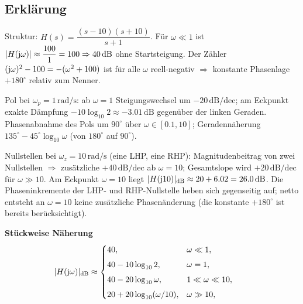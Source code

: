 \subsection{Erklärung}
\vspace{5mm}
\begin{description}[leftmargin=1.2em,labelsep=.6em,font=\bfseries]
\item[Schritt 1] Struktur: $H(s)=\dfrac{(s-10)(s+10)}{s+1}$. Für $\omega\ll1$ ist $|H(\operatorname{j}\!\omega)|\approx\dfrac{100}{1}=100\Rightarrow 40\,\mathrm{dB}$ ohne Startsteigung. Der Zähler $(\operatorname{j}\!\omega)^2-100=-(\omega^2+100)$ ist für alle $\omega$ reell-negativ $\Rightarrow$ konstante Phasenlage $+180^\circ$ relativ zum Nenner.
\item[Schritt 2] Pol bei $\omega_p=1\,\mathrm{rad/s}$: ab $\omega=1$ Steigungswechsel um $-20\,\mathrm{dB/dec}$; am Eckpunkt exakte Dämpfung $-10\log_{10}2\approx-3.01\,\mathrm{dB}$ gegenüber der linken Geraden. Phasenabnahme des Pols um $90^\circ$ über $\omega\in[0.1,10]$; Geradennäherung $135^\circ-45^\circ\log_{10}\omega$ (von $180^\circ$ auf $90^\circ$).
\item[Schritt 3] Nullstellen bei $\omega_z=10\,\mathrm{rad/s}$ (eine LHP, eine RHP): Magnitudenbeitrag von zwei Nullstellen $\Rightarrow$ zusätzliche $+40\,\mathrm{dB/dec}$ ab $\omega=10$; Gesamtslope wird $+20\,\mathrm{dB/dec}$ für $\omega\gg10$. Am Eckpunkt $\omega=10$ liegt $|H(\operatorname{j}\!10)|_{\mathrm{dB}}\approx20+6.02=26.0\,\mathrm{dB}$. Die Phaseninkremente der LHP- und RHP-Nullstelle heben sich gegenseitig auf; netto entsteht an $\omega=10$ keine zusätzliche Phasenänderung (die konstante $+180^\circ$ ist bereits berücksichtigt).
\end{description}

\vspace{0.5cm}
\medskip
\noindent\textbf{Stückweise Näherung}
\[
|H(\operatorname{j}\!\omega)|_{\mathrm{dB}}\approx
\begin{cases}
40,& \omega\ll1,\\[4pt]
40-10\log_{10}2,& \omega=1,\\[4pt]
40-20\log_{10}\omega,& 1\ll\omega\ll10,\\[4pt]
20+20\log_{10}(\omega/10),& \omega\gg10,
\end{cases}
\qquad
\]
\newpage